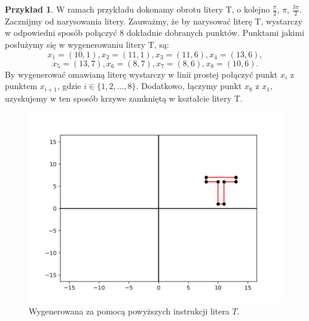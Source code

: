 \documentclass[a4paper,twoside,11pt,reqno]{mwrep}
\theoremstyle{plain} \newtheorem{twr}{Twierdzenie}
\theoremstyle{plain} \newtheorem{lem}{Lemat}
\theoremstyle{definition} \newtheorem{defi}{Definicja}
\theoremstyle{remark} \newtheorem*{wni}{Wniosek}
\theoremstyle{definition} \newtheorem{uwaga}{Uwaga}
\theoremstyle{definition}\newtheorem{prz}{Przykład}
\begin{document}
\begin{prz}\label{exT_rotation}
W ramach przykładu dokonamy obrotu litery T, o kolejno $\frac{\pi}{2}$, $\pi$, $\frac{3\pi}{2}$.
Zacznijmy od narysowania litery. Zauważmy, że by narysować literę T, wystarczy w
odpowiedni sposób połączyć $8$ dokładnie dobranych punktów.
Punktami jakimi posłużymy się w wygenerowaniu litery T, są:
$$x_1 = (10,1),x_2 = (11,1),x_3 = (11,6),x_4 = (13,6),$$
$$x_5 = (13,7),x_6 = (8,7),x_7 = (8,6),x_8 = (10,6).$$
By wygenerować omawianą literę wystarczy w linii prostej połączyć punkt
$x_i$ z punktem $x_{i+1}$, gdzie $i\in\{1,2,...,8\}$. Dodatkowo,
łączymy punkt $x_8$ z $x_1$, uzyskujemy w ten sposób krzywe zamkniętą
w kształcie litery T.

\begin{figure}[h]
\begin{center}
\includegraphics[width=7 cm]{T_samo.png}
\caption{Wygenerowana za pomocą powyższych instrukcji litera $T$.}
\end{center}
\end{figure}
\newpage


\end{prz}
\end{document}
